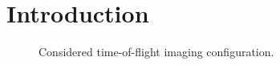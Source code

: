 \documentclass{article}
\newcommand{\vect}[1]{\bm{#1}}
\newcommand{\ser}[2]{#1^{#2}}
\theoremstyle{definition}
\begin{document}
\section{Introduction}
\label{sec_intro}
\begin{figure}[htb]
	\centering
	
	\caption{Considered time-of-flight imaging configuration.}
	\label{fig_pulse_echo}
\end{figure}

\end{document}
